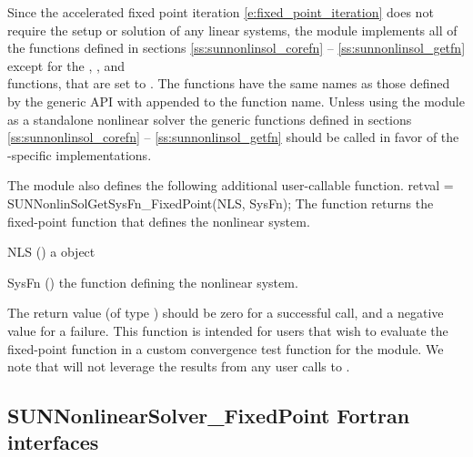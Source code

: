 Since the accelerated fixed point iteration
\eqref{e:fixed_point_iteration} does not require the setup or solution
of any linear systems, the {\sunnonlinsolfixedpoint} module implements
all of the functions defined in sections \ref{ss:sunnonlinsol_corefn} --
\ref{ss:sunnonlinsol_getfn} except for the ,
, and \\ \noindent
{} functions, that are set to .
The {\sunnonlinsolfixedpoint} functions have the same names as those
defined by the generic {\sunnonlinsol} API with 
appended to the function name.  Unless using the
{\sunnonlinsolfixedpoint} module as a standalone nonlinear solver the
generic functions defined in sections \ref{ss:sunnonlinsol_corefn} --
\ref{ss:sunnonlinsol_getfn} should be called in favor of the
{\sunnonlinsolfixedpoint}-specific implementations. 

The {\sunnonlinsolfixedpoint} module also defines the following additional
user-callable function.
{
  retval = SUNNonlinSolGetSysFn\_FixedPoint(NLS, SysFn);
}
{
  The function  returns the fixed-point
  function that defines the nonlinear system.
}
{
  \begin{args}[SysFn]
  \item[NLS] ()
    a {\sunnonlinsol} object
  \item[SysFn] ()
    the function defining the nonlinear system.
  \end{args}
}
{
  The return value  (of type ) should be zero for a
  successful call, and a negative value for a failure.
}
{
  This function is intended for users that wish to evaluate the
  fixed-point function in a custom convergence test function for the
  {\sunnonlinsolfixedpoint} module. We note that {\sunnonlinsolfixedpoint}
  will not leverage the results from any user calls to .
}


\subsection{SUNNonlinearSolver\_FixedPoint Fortran interfaces}
\label{ss:sunnonlinsolfixedpoint_fortran}

